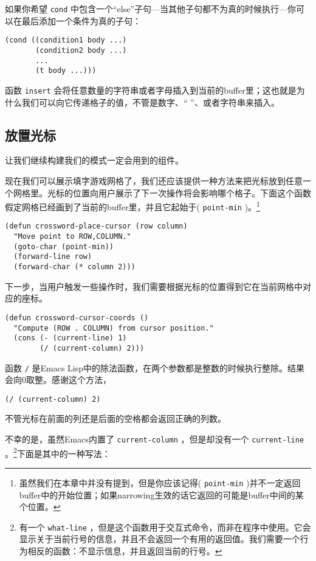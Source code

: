 如果你希望 \texttt{cond} 中包含一个“else”子句---当其他子句都不为真的时候执行---你可以在最后添加一个条件为真的子句：

\begin{verbatim}
(cond ((condition1 body ...)
       (condition2 body ...)
       ...
       (t body ...)))
\end{verbatim}

函数 \texttt{insert} 会将任意数量的字符串或者字母插入到当前的buffer里；这也就是为什么我们可以向它传递格子的值，不管是数字、“ ”、或者字符串来插入。

\subsection{放置光标}
\label{section:10-Cursor-Positioning}

让我们继续构建我们的模式一定会用到的组件。

现在我们可以展示填字游戏网格了，我们还应该提供一种方法来把光标放到任意一个网格里。光标的位置向用户展示了下一次操作将会影响哪个格子。下面这个函数假定网格已经画到了当前的buffer里，并且它起始于( \texttt{point-min} )。\footnote{虽然我们在本章中并没有提到，但是你应该记得( \texttt{point-min} )并不一定返回buffer中的开始位置；如果narrowing生效的话它返回的可能是buffer中间的某个位置。}

\begin{verbatim}
(defun crossword-place-cursor (row column)
  "Move point to ROW,COLUMN."
  (goto-char (point-min))
  (forward-line row)
  (forward-char (* column 2)))
\end{verbatim}

下一步，当用户触发一些操作时，我们需要根据光标的位置得到它在当前网格中对应的座标。

\begin{verbatim}
(defun crossword-cursor-coords ()
  "Compute (ROW . COLUMN) from cursor position."
  (cons (- (current-line) 1)
        (/ (current-column) 2)))
\end{verbatim}

函数 \texttt{/} 是Emacs Lisp中的除法函数，在两个参数都是整数的时候执行整除。结果会向0取整。感谢这个方法，

\begin{verbatim}
(/ (current-column) 2)
\end{verbatim}

不管光标在前面的列还是后面的空格都会返回正确的列数。

不幸的是，虽然Emacs内置了 \texttt{current-column} ，但是却没有一个 \texttt{current-line} 。\footnote{有一个 \texttt{what-line} ，但是这个函数用于交互式命令，而非在程序中使用。它会显示关于当前行号的信息，并且不会返回一个有用的返回值。我们需要一个行为相反的函数：不显示信息，并且返回当前的行号。}下面是其中的一种写法：

